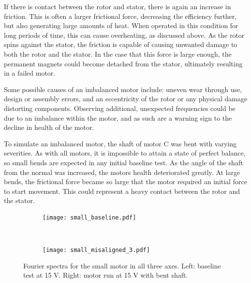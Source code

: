 If there is contact between the rotor and stator, there is again an increase in friction. This is often a larger frictional force, decreasing the efficiency further, but also generating large amounts of heat. When operated in this condition for long periods of time, this can cause overheating, as discussed above. As the rotor spins against the stator, the friction is capable of causing unwanted damage to both the rotor and the stator. In the case that this force is large enough, the permanent magnets could become detached from the stator, ultimately resulting in a failed motor.

Some possible causes of an imbalanced motor include: uneven wear through use, design or assembly errors, and an eccentricity of the rotor or any physical damage distorting components. Observing additional, unexpected frequencies could be due to an imbalance within the motor, and as such are a warning sign to the decline in health of the motor. 


To simulate an imbalanced motor, the shaft of motor C was bent with varying severities. 
As with all motors, it is impossible to attain a state of perfect balance, so small bends are expected in any initial baseline test. As the angle of the shaft from the normal was increased, the motors health deteriorated greatly. At large bends, the frictional force became so large that the motor required an initial force to start movement. This could represent a heavy contact between the rotor and the stator. 

\begin{figure}[t!]
    \centering
    \begin{subfigure}[t]{0.5\textwidth}
        \centering
        \texttt{[image: small\_baseline.pdf]}
    \end{subfigure}%
    ~ 
    \begin{subfigure}[t]{0.5\textwidth}
        \centering
        \texttt{[image: small\_misaligned\_3.pdf]}
    \end{subfigure}
    \caption[Fourier Plot Misaligned Shaft]{Fourier spectra for the small motor in all three axes. Left: baseline test at 15 V. Right: motor run at 15 V with bent shaft.}
    \label{fig:bent_shaft_fourier}
\end{figure}

